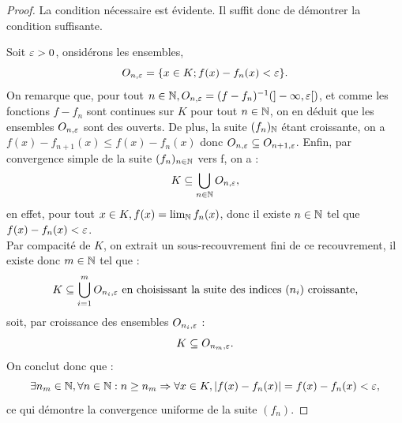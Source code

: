 \begin{proof}
La condition nécessaire est évidente. Il suffit donc de démontrer la condition suffisante. \newline


Soit $\varepsilon >0$, onsidérons les ensembles, 
\[ O_{n, \varepsilon} = \{x \in K ; f(x)-f_n(x) < \varepsilon \} . \] 
On remarque que, pour tout $n \in \mathbb{N}, O_{n, \varepsilon}=(f-f_n)^{-1}(]-\infty, \varepsilon[)$, 
et comme les fonctions $f-f_n$ sont continues sur $K$ pour tout $n \in \mathbb{N}$, 
on en déduit que les ensembles $O_{n, \varepsilon}$ sont des ouverts.
De plus, la suite $(f_n)_{\mathbb{N}}$ étant croissante, on a $f(x) - f_{n+1}(x) \leq f(x)-f_n(x)$ donc $O_{n, \varepsilon} \subseteq O_{n+1, \varepsilon}$.
Enfin, par convergence simple de la suite $(f_n)_{n \in \mathbb{N}}$ vers f, on a :
\[ K \subseteq \bigcup_{n \in \mathbb{N}} O_{n, \varepsilon} , \]
en effet, pour tout $x \in K, f(x) = \lim_{\mathbb{N}} f_n(x)$, donc il existe $n \in \mathbb{N}$ tel que $f(x)-f_n(x) < \varepsilon$. \\
Par compacité de $K$, on extrait un sous-recouvrement fini de ce recouvrement, il existe donc $m \in \mathbb{N}$ tel que :
\[ K \subseteq \bigcup_{i=1}^m O_{n_i, \varepsilon} \text{ en choisissant la suite des indices $(n_i)$ croissante,} \]
soit, par croissance des ensembles $O_{n_i, \varepsilon}$ :
\[ K \subseteq O_{n_m, \varepsilon} . \]
On conclut donc que :
\[ \exists n_m \in \mathbb{N}, \forall n \in \mathbb{N} : n \geq n_m \Rightarrow \forall x \in K, \lvert f(x)-f_n(x)\rvert = f(x) - f_n(x) < \varepsilon , \]
ce qui démontre la convergence uniforme de la suite $(f_n)$.
\end{proof}

